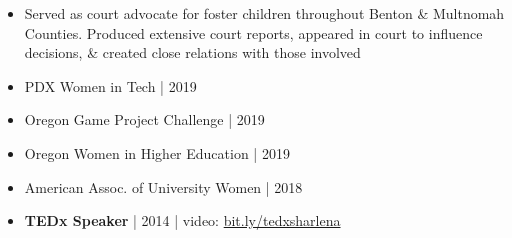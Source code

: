 \begin{itemize}
    \item {Served as court advocate for foster children throughout Benton \& Multnomah Counties. Produced extensive court reports, appeared in court to influence decisions, \& created close relations with those involved}
\end{itemize}



\begin{itemize}
    \item{PDX Women in Tech | 2019}
    \item{Oregon Game Project Challenge | 2019}
    \item{Oregon Women in Higher Education | 2019}
    \item{American Assoc. of University Women | 2018}
    \item{ \textbf{TEDx Speaker} | 2014 | video: {\href{https://www.youtube.com/watch?v=wex-7n593cI}{bit.ly/tedxsharlena}}}
\end{itemize}
\smallskip